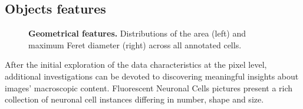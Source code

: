 \subsection{Objects features}
\begin{figure}
    \centering
    \caption{\textbf{Geometrical features.} Distributions of the area (left) and maximum Feret diameter (right) across all annotated cells.}
    \label{fig:dataset:geom}
\end{figure}
After the initial exploration of the data characteristics at the pixel level, additional investigations can be devoted to discovering meaningful insights about images' macroscopic content.
Fluorescent Neuronal Cells pictures present a rich collection of neuronal cell instances differing in number, shape and size.

